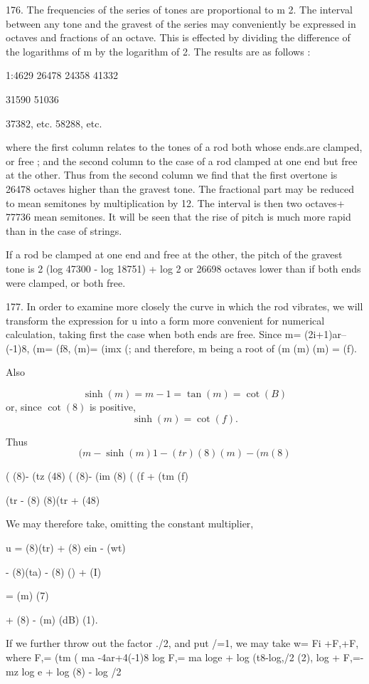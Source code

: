 176. The frequencies of the series of tones are proportional to m 2. The
interval between any tone and the gravest of the series may conveniently
be expressed in octaves and fractions of an octave. This is effected by
dividing the difference of the logarithms of m by the logarithm of 2.
The results are as follows :

1:4629 26478 24358 41332

31590 51036

37382, etc. 58288, etc.

where the first column relates to the tones of a rod both whose ends.are
clamped, or free ; and the second column to the case of a rod clamped at
one end but free at the other. Thus from the second column we find that
the first overtone is 26478 octaves higher than the gravest tone. The
fractional part may be reduced to mean semitones by multiplication by
12. The interval is then two octaves+ 77736 mean semitones. It will be
seen that the rise of pitch is much more rapid than in the case of
strings.

If a rod be clamped at one end and free at the other, the pitch of the
gravest tone is 2 (log 47300 - log 18751) + log 2 or 26698 octaves lower
than if both ends were clamped, or both free.

177. In order to examine more closely the curve in which the rod
vibrates, we will transform the expression for u into a form more
convenient for numerical calculation, taking first the case when both
ends are free. Since m= (2i+1)ar--(-1)8, (m= (f8, (m)= (imx (; and
therefore, m being a root of (m (m) (m) = (f).

Also

\[ \sinh(m) = m - 1 = \tan(m) = \cot(B) \]
or, since \( \cot(8)\)  is positive,
\[ \sinh(m) = \cot(f).  \]

Thus
\[ (m - \sinh(m) 1 - (tr) (8) (m) - (m (8) \]

( (8)- (tz (48) ( (8)- (im (8) ( (f + (tm (f)

(tr - (8) (8)(tr + (48)

We may therefore take, omitting the constant multiplier,

u = (8)(tr) + (8) ein - (wt)

- (8)(ta) - (8) () + (I)

= (m) (7)

+ (8) - (m) (dB) (1).

If we further throw out the factor ./2, and put /=1, we may take w= Fi
+F,+F, where F,= (tm ( ma -4ar+4(-1)8 log F,= ma loge + log (t8-log,/2
(2), log + F,=- mz log e + log (8) - log /2

